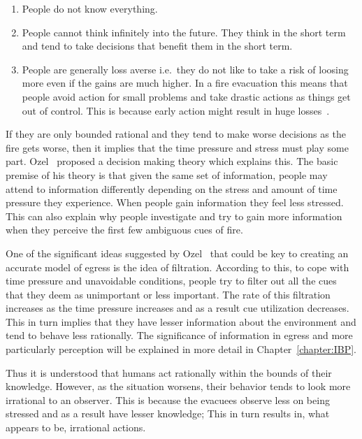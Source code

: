 \begin{enumerate}
\item People do not know everything.
\item People cannot think infinitely into the future. They think in the short term and tend to take decisions that benefit them in the short term.
\item People are generally loss averse i.e.\ they do not like to take a risk of loosing more even if the gains are much higher. In a fire evacuation this means that people avoid action for small problems and take drastic actions as things get out of control. This is because early action might result in huge losses~\cite{Graham:2000vl}.
\end{enumerate}

If they are only bounded rational and they tend to make worse decisions as the fire gets worse, then it implies that the time pressure and stress must play some part. Ozel~\cite{Ozel:2001tn} proposed a decision making theory which explains this. The basic premise of his theory is that given the same set of information, people may attend to information differently depending on the stress and amount of time pressure they experience. When people gain information they feel less stressed. This can also explain why people investigate and try to gain more information when they perceive the first few ambiguous cues of fire. %

One of the significant ideas suggested by Ozel~\cite{Ozel:2001tn} that could be key to creating an accurate model of egress is the idea of filtration. According to this, to cope with time pressure and unavoidable conditions, people try to filter out all the cues that they deem as unimportant or less important. The rate of this filtration increases as the time pressure increases and as a result cue utilization decreases. This in turn implies that they have lesser information about the environment and tend to behave less rationally. The significance of information in egress and more particularly perception will be explained in more detail in Chapter~\ref{chapter:IBP}.

Thus it is understood that humans act rationally within the bounds of their knowledge. However, as the situation worsens, their behavior tends to look more irrational to an observer. This is because the evacuees observe less on being stressed and as a result have lesser knowledge; This in turn results in, what appears to be, irrational actions.

